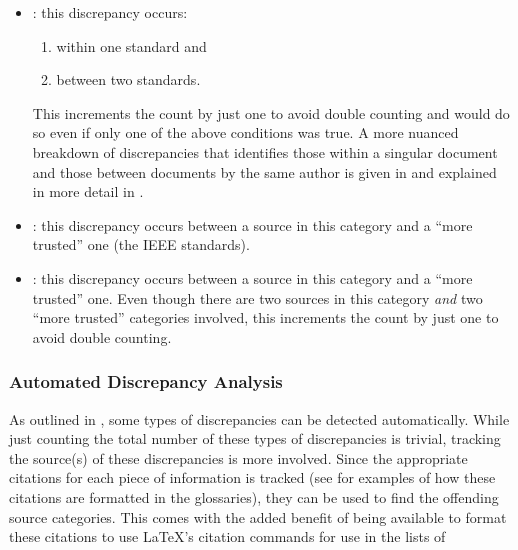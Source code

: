 \begin{itemize}
    \item \textbf{}: this discrepancy occurs:
          \begin{enumerate}
              \item within one standard and
              \item between two standards.
          \end{enumerate}
          This increments the count by just one to avoid double counting and
          would do so even if only one of the above conditions was true. A more
          nuanced breakdown of discrepancies that identifies those within a
          singular document and those between documents by the same author is
          given in  and explained in more detail in
          .
    \item \textbf{}: this discrepancy occurs between a
          source in this category and a ``more trusted'' one
          (the IEEE standards).
    \item \textbf{}: this discrepancy occurs between a
          source in this category and a ``more trusted'' one. Even though there
          are two sources in this category \emph{and} two ``more trusted''
          categories involved, this increments the count by just one to avoid
          double counting.
\end{itemize}

\subsubsection{Automated Discrepancy Analysis}
\label{auto-discrep-analysis}

As outlined in , some types of discrepancies can be detected
automatically. While just counting the total number of these types of
discrepancies is trivial, tracking the source(s) of these discrepancies is more
involved. Since the appropriate citations for each piece of information is
tracked (see  for examples of
how these citations are formatted in the glossaries), they can be used to find
the offending source categories. This comes with the added benefit of being
available to format these citations to use \LaTeX{}'s citation commands for use
in the lists of \autoDiscreps[.]{}

